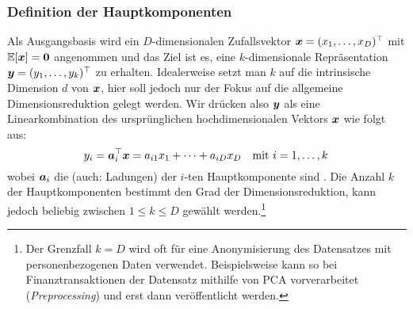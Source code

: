 \subsubsection{Definition der Hauptkomponenten}
\label{ch:MethodenDerDimRed:statistisch:PCA:Definition}
Als Ausgangsbasis wird ein $D$-dimensionalen Zufallsvektor $\bm{x} = (x_1, \ldots, x_D)^\top$ mit $\operatorname{\mathbb{E}}[\bm{x}] = \bm{0}$ angenommen und das Ziel ist es, eine $k$-dimensionale Repräsentation $\bm{y} = (y_1,\ldots,y_k)^\top$ zu erhalten. Idealerweise setzt man $k$ auf die intrinsische Dimension $d$ von $\bm{x}$, hier soll jedoch nur der Fokus auf die allgemeine Dimensionsreduktion gelegt werden. Wir drücken also $\bm{y}$ als eine Linearkombination des ursprünglichen hochdimensionalen Vektors $\bm{x}$ wie folgt aus:
\begin{equation}
	y_i = \bm{a}_i^\top \bm{x} = a_{i1} x_1 + \cdots + a_{iD} x_D
	\quad \text{mit } i = 1,\ldots,k \,
\end{equation}
wobei $\bm{a}_i$ die  (auch: Ladungen) der $i$-ten Hauptkomponente sind \parencite[vgl.][2]{Jolliffe.2002}. Die Anzahl $k$ der Hauptkomponenten bestimmt den Grad der
Dimensionsreduktion, kann jedoch beliebig zwischen $1 \leq k \leq D$ gewählt werden.\footnote{Der
	Grenzfall $k = D$ wird oft für eine Anonymisierung des Datensatzes mit personenbezogenen Daten
	verwendet. Beispielsweise kann so bei Finanztransaktionen der Datensatz mithilfe von PCA
	vorverarbeitet (\textit{Preprocessing}) und erst dann veröffentlicht werden.}

